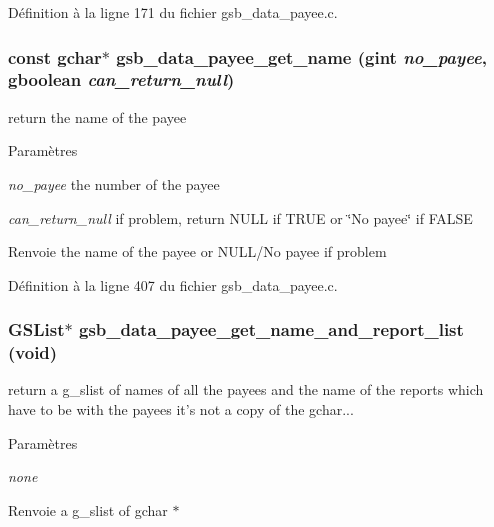Définition à la ligne 171 du fichier gsb\_\-data\_\-payee.c.

\subsubsection[{gsb\_\-data\_\-payee\_\-get\_\-name}]{\setlength{\rightskip}{0pt plus 5cm}const gchar$\ast$ gsb\_\-data\_\-payee\_\-get\_\-name (gint {\em no\_\-payee}, \/  gboolean {\em can\_\-return\_\-null})}\label{gsb__data__payee_8c_adc6080b7376628d3902f5fd861deb45a}
return the name of the payee


\begin{DoxyParams}{Paramètres}
\item[{\em no\_\-payee}]the number of the payee \item[{\em can\_\-return\_\-null}]if problem, return NULL if TRUE or \char`\"{}No payee\char`\"{} if FALSE\end{DoxyParams}
\begin{DoxyReturn}{Renvoie}
the name of the payee or NULL/No payee if problem 
\end{DoxyReturn}


Définition à la ligne 407 du fichier gsb\_\-data\_\-payee.c.

\subsubsection[{gsb\_\-data\_\-payee\_\-get\_\-name\_\-and\_\-report\_\-list}]{\setlength{\rightskip}{0pt plus 5cm}GSList$\ast$ gsb\_\-data\_\-payee\_\-get\_\-name\_\-and\_\-report\_\-list (void)}\label{gsb__data__payee_8c_a04e398908c76c8314a9dcf22dcadaf49}
return a g\_\-slist of names of all the payees and the name of the reports which have to be with the payees it's not a copy of the gchar...


\begin{DoxyParams}{Paramètres}
\item[{\em none}]\end{DoxyParams}
\begin{DoxyReturn}{Renvoie}
a g\_\-slist of gchar $\ast$ 
\end{DoxyReturn}


